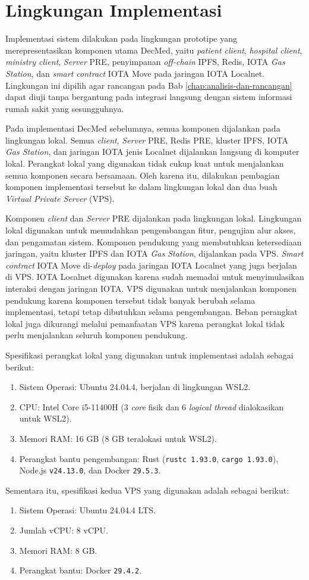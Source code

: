 \section{Lingkungan Implementasi}
\label{sec:lingkungan-implementasi}

Implementasi sistem dilakukan pada lingkungan prototipe yang merepresentasikan komponen utama DecMed, yaitu \textit{patient client}, \textit{hospital client}, \textit{ministry client}, \textit{Server} PRE, penyimpanan \textit{off-chain} IPFS, Redis, IOTA \textit{Gas Station}, dan \textit{smart contract} IOTA Move pada jaringan IOTA Localnet. Lingkungan ini dipilih agar rancangan pada Bab \ref{chap:analisis-dan-rancangan} dapat diuji tanpa bergantung pada integrasi langsung dengan sistem informasi rumah sakit yang sesungguhnya.

Pada implementasi DecMed sebelumnya, semua komponen dijalankan pada lingkungan lokal. Semua \textit{client}, \textit{Server} PRE, Redis PRE, kluster IPFS, IOTA \textit{Gas Station}, dan jaringan IOTA jenis Localnet dijalankan langsung di komputer lokal. Perangkat lokal yang digunakan tidak cukup kuat untuk menjalankan semua komponen secara bersamaan. Oleh karena itu, dilakukan pembagian komponen implementasi tersebut ke dalam lingkungan lokal dan dua buah \textit{Virtual Private Server} (VPS).

Komponen \textit{client} dan \textit{Server} PRE dijalankan pada lingkungan lokal. Lingkungan lokal digunakan untuk memudahkan pengembangan fitur, pengujian alur akses, dan pengamatan sistem. Komponen pendukung yang membutuhkan ketersediaan jaringan, yaitu kluster IPFS dan IOTA \textit{Gas Station}, dijalankan pada VPS. \textit{Smart contract} IOTA Move di-\textit{deploy} pada jaringan IOTA Localnet yang juga berjalan di VPS. IOTA Localnet digunakan karena sudah memadai untuk menyimulasikan interaksi dengan jaringan IOTA. VPS digunakan untuk menjalankan komponen pendukung karena komponen tersebut tidak banyak berubah selama implementasi, tetapi tetap dibutuhkan selama pengembangan. Beban perangkat lokal juga dikurangi melalui pemanfaatan VPS karena perangkat lokal tidak perlu menjalankan seluruh komponen pendukung.

Spesifikasi perangkat lokal yang digunakan untuk implementasi adalah sebagai berikut:
\begin{enumerate}
	\item Sistem Operasi: Ubuntu 24.04.4, berjalan di lingkungan WSL2.
	\item CPU: Intel Core i5-11400H (3 \textit{core} fisik dan 6 \textit{logical thread} dialokasikan untuk WSL2).
	\item Memori RAM: 16 GB (8 GB teralokasi untuk WSL2).
	\item Perangkat bantu pengembangan: Rust (\texttt{rustc 1.93.0}, \texttt{cargo 1.93.0}), Node.js \texttt{v24.13.0}, dan Docker \texttt{29.5.3}.
\end{enumerate}

Sementara itu, spesifikasi kedua VPS yang digunakan adalah sebagai berikut:
\begin{enumerate}
	\item Sistem Operasi: Ubuntu 24.04.4 LTS.
	\item Jumlah vCPU: 8 vCPU.
	\item Memori RAM: 8 GB.
	\item Perangkat bantu: Docker \texttt{29.4.2}.
\end{enumerate}
